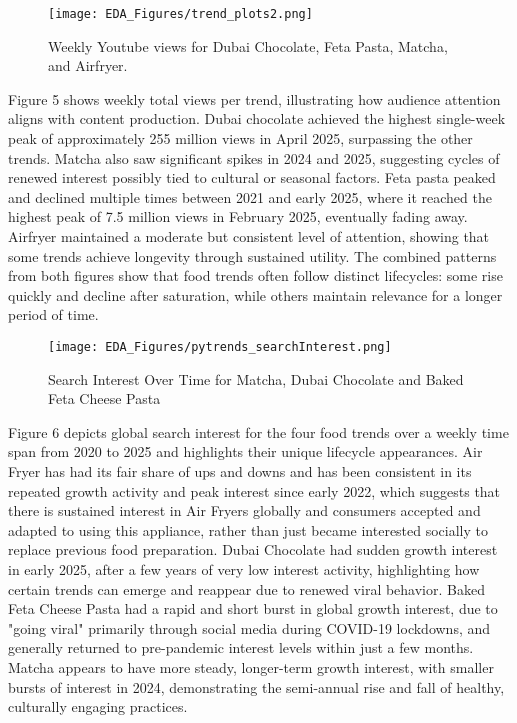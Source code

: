 \documentclass{article}
\begin{document}
\begin{figure}[H]
    \centering
    \texttt{[image: EDA\_Figures/trend\_plots2.png]}
    \caption{Weekly Youtube views for Dubai Chocolate, Feta Pasta, Matcha, and Airfryer.}
    \label{fig:trend_plots2}
\end{figure}

Figure 5 shows weekly total views per trend, illustrating how audience attention aligns with content production. Dubai chocolate achieved the highest single-week peak of approximately 255 million views in April 2025, surpassing the other trends. Matcha also saw significant spikes in 2024 and 2025, suggesting cycles of renewed interest possibly tied to cultural or seasonal factors. Feta pasta peaked and declined multiple times between 2021 and early 2025, where it reached the highest peak of 7.5 million views in February 2025, eventually fading away. Airfryer maintained a moderate but consistent level of attention, showing that some trends achieve longevity through sustained utility. The combined patterns from both figures show that food trends often follow distinct lifecycles: some rise quickly and decline after saturation, while others maintain relevance for a longer period of time. 


\begin{figure}[H]
    \centering
    \texttt{[image: EDA\_Figures/pytrends\_searchInterest.png]}
    \caption{Search Interest Over Time for Matcha, Dubai Chocolate and Baked Feta Cheese Pasta}
    \label{fig:pytrends_SI}
\end{figure}

Figure 6 depicts global search interest for the four food trends over a weekly time span from 2020 to 2025 and highlights their unique lifecycle appearances. Air Fryer has had its fair share of ups and downs and has been consistent in its repeated growth activity and peak interest since early 2022, which suggests that there is sustained interest in Air Fryers globally and consumers accepted and adapted to using this appliance, rather than just became interested socially to replace previous food preparation. Dubai Chocolate had sudden growth interest in early 2025, after a few years of very low interest activity, highlighting how certain trends can emerge and reappear due to renewed viral behavior. Baked Feta Cheese Pasta had a rapid and short burst in global growth interest, due to "going viral" primarily through social media during COVID-19 lockdowns, and generally returned to pre-pandemic interest levels within just a few months. Matcha appears to have more steady, longer-term growth interest, with smaller bursts of interest in 2024, demonstrating the semi-annual rise and fall of healthy, culturally engaging practices. 
\end{document}
